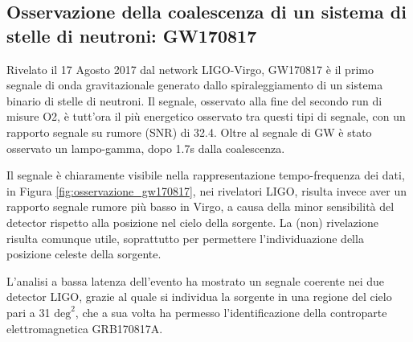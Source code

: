 \subsection{Osservazione della coalescenza di un sistema di stelle di neutroni: GW170817}
\label{section:osservazioneInspiralGW170817} 
Rivelato il 17 Agosto 2017 dal network LIGO-Virgo, GW170817 è il primo segnale di onda gravitazionale generato dallo spiraleggiamento di un sistema binario di stelle di neutroni.
Il segnale, osservato alla fine del secondo run di misure O2, è tutt'ora il più energetico osservato tra questi tipi di segnale, con un rapporto segnale su rumore (SNR) di 32.4.
Oltre al segnale di GW è stato osservato un lampo-gamma, dopo 1.7s dalla coalescenza\cite{Abbott_2017a}.

Il segnale è chiaramente visibile nella rappresentazione tempo-frequenza dei dati, in Figura  \ref{fig:osservazione_gw170817}, nei rivelatori LIGO, risulta invece aver un rapporto segnale rumore più basso in Virgo, a causa della minor sensibilità del detector rispetto alla posizione nel cielo della sorgente. La (non) rivelazione risulta comunque utile, soprattutto per permettere l'individuazione della posizione celeste della sorgente.

L'analisi a bassa latenza dell'evento ha mostrato un segnale coerente nei due detector LIGO, grazie al quale si individua la sorgente in una regione del cielo pari a 31 $\text{deg}^2$, che a sua volta ha permesso l'identificazione della controparte elettromagnetica GRB170817A. 

